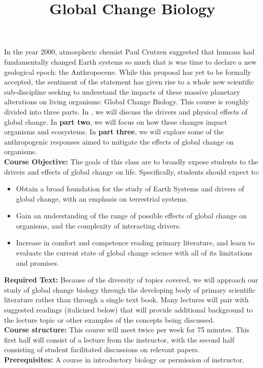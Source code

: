 \documentclass[12pt]{article}\usepackage[]{graphicx}\usepackage[]{color}
\begin{document}
\title{Global Change Biology}
\date{}
\maketitle{}
\indent In the year 2000, atmospheric chemist Paul Crutzen suggested that humans had fundamentally changed Earth systems so much that is was time to declare a new geological epoch: the Anthropocene. While this proposal has yet to be formally accepted, the sentiment of the statement has given rise to a whole new scientific sub-discipline seeking to understand the impacts of these massive planetary alterations on living organisms: Global Change Biology. This course is roughly divided into three parts. In , we will discuss the drivers and physical effects of global change. In \textbf{part two}, we will focus on how these changes impact organisms and ecosystems. In \textbf{part three}, we will explore some of the anthropogenic responses aimed to mitigate the effects of global change on organisms. \\

\indent\textbf{Course Objective:} The goals of this class are to broadly expose students to the drivers and effects of global change on life. Specifically, students should expect to:
\begin{itemize}
\item Obtain a broad foundation for the study of Earth Systems and drivers of global change, with an emphasis on terrestrial systems.
\item Gain an understanding of the range of possible effects of global change on organisms, and the complexity of interacting drivers.
\item Increase in comfort and competence reading primary literature, and learn to evaluate the current state of global change science with all of its limitations and promises.
\end{itemize}
\textbf{Required Text:} Because of the diversity of topics covered, we will approach our study of global change biology through the developing body of primary scientific literature rather than through a single text book. Many lectures will pair with suggested readings (italicized below) that will provide additional background to the lecture topic or other examples of the concepts being discussed.\\
\textbf{Course structure:} This course will meet twice per week for 75 minutes. This first half will consist of a lecture from the instructor, with the second half consisting of student facilitated discussions on relevant papers.\\
\textbf{Prerequisites:} A course in introductory biology or permission of instructor.\\
\end{document}
